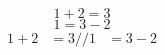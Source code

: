 \documentclass{article}
\begin{document}
	\begin{equation*}
	1 + 2 = 3
	\end{equation*}
	\begin{equation*}
	1 = 3 - 2
	\end{equation*}
    \begin{align*}
1 +2 & = 3//
1 &= 3-2
\end{align*}
\end{document}
